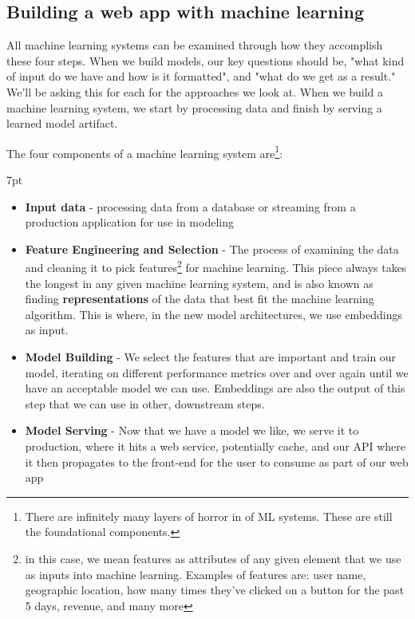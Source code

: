 \documentclass[11pt, table]{diazessay} %
\newenvironment{formal}{%
  \def\FrameCommand{%
    \hspace{1pt}%
    {\color{w_lightblue}\vrule width 2pt}%
    {\color{formalshade}\vrule width 4pt}%
    \colorbox{formalshade}%
  }%
  \MakeFramed{\advance\hsize-\width\FrameRestore}%
  \noindent\hspace{-4.55pt}%
  \begin{adjustwidth}{}{7pt}%
  \vspace{2pt}\vspace{2pt}%
}
{%
  \vspace{2pt}\end{adjustwidth}\endMakeFramed%
}
\begin{document}
\begin{sloppypar}
\subsection{Building a web app with machine learning}

All machine learning systems can be examined through how they accomplish these four steps. When we build models, our key questions should be, "what kind of input do we have and how is it formatted", and "what do we get as a result." We'll be asking this for each for the approaches we look at.  When we build a machine learning system, we start by processing data and finish by serving a learned model artifact. 

The four components of a machine learning system are\footnote{There are infinitely many layers of horror in of ML systems\citep{kreuzberger2022machine}. These are still the foundational components.}:

\begin{formal}
\begin{itemize}
  \item \textbf{Input data} - processing data from a database or streaming from a production application for use in modeling
  \item \textbf{Feature Engineering and Selection} - The process of examining the data and cleaning it to pick features\footnote{in this case, we mean features as attributes of any given element that we use as inputs into machine learning. Examples of features are: user name, geographic location, how many times they've clicked on a button for the past 5 days, revenue, and many more} for machine learning. This piece always takes the longest in any given machine learning system, and is also known as finding \textbf{representations}\citep{bengio2013representation} of the data that best fit the machine learning algorithm. This is where, in the new model architectures, we use embeddings as input. 
  \item \textbf{Model Building} - We select the features that are important and train our model, iterating on different performance metrics over and over again until we have an acceptable model we can use. Embeddings are also the output of this step that we can use in other, downstream steps. 
  \item \textbf{Model Serving} - Now that we have a model we like, we serve it to production, where it hits a web service, potentially cache, and our API where it then propagates to the front-end for the user to consume as part of our web app
\end{itemize}
\end{formal}


\end{sloppypar}
\end{document}
